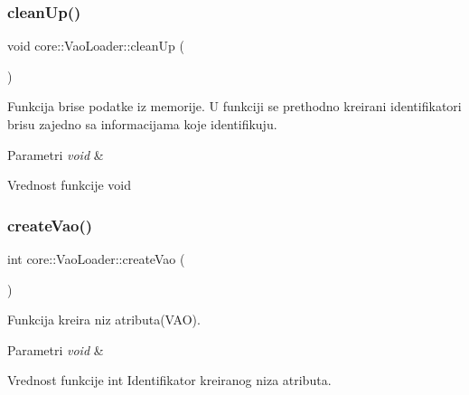 \subsubsection{\texorpdfstring{clean\+Up()}{cleanUp()}}
{\footnotesize\ttfamily void core\+::\+Vao\+Loader\+::clean\+Up (\begin{DoxyParamCaption}\item[{void}]{ }\end{DoxyParamCaption})}



Funkcija brise podatke iz memorije. U funkciji se prethodno kreirani identifikatori brisu zajedno sa informacijama koje identifikuju. 


\begin{DoxyParams}{Parametri}
{\em void} & \\
\hline
\end{DoxyParams}
\begin{DoxyReturn}{Vrednost funkcije}
void 
\end{DoxyReturn}
\mbox{\label{classcore_1_1VaoLoader_af76598a15d38378e594778d9a63a7a6a}} 
\subsubsection{\texorpdfstring{create\+Vao()}{createVao()}}
{\footnotesize\ttfamily int core\+::\+Vao\+Loader\+::create\+Vao (\begin{DoxyParamCaption}\item[{void}]{ }\end{DoxyParamCaption})\hspace{0.3cm}{\ttfamily [private]}}



Funkcija kreira niz atributa(\+V\+A\+O). 


\begin{DoxyParams}{Parametri}
{\em void} & \\
\hline
\end{DoxyParams}
\begin{DoxyReturn}{Vrednost funkcije}
int Identifikator kreiranog niza atributa. 
\end{DoxyReturn}
\mbox{\label{classcore_1_1VaoLoader_a8310742834449c159828f87e771a5258}} 
